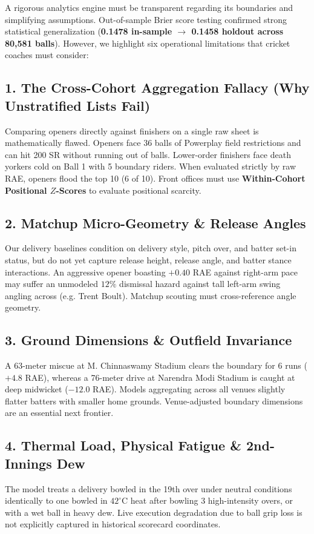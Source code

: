 \documentclass[10pt,a4paper]{article}
\begin{document}
A rigorous analytics engine must be transparent regarding its boundaries and simplifying assumptions. Out-of-sample Brier score testing confirmed strong statistical generalization (\textbf{0.1478 in-sample $\to$ 0.1458 holdout across 80,581 balls}). However, we highlight six operational limitations that cricket coaches must consider:

\subsection*{1. The Cross-Cohort Aggregation Fallacy (Why Unstratified Lists Fail)}
Comparing openers directly against finishers on a single raw sheet is mathematically flawed. Openers face 36 balls of Powerplay field restrictions and can hit 200 SR without running out of balls. Lower-order finishers face death yorkers cold on Ball 1 with 5 boundary riders. When evaluated strictly by raw RAE, openers flood the top 10 (6 of 10). Front offices must use \textbf{Within-Cohort Positional $Z$-Scores} to evaluate positional scarcity.

\subsection*{2. Matchup Micro-Geometry \& Release Angles}
Our delivery baselines condition on delivery style, pitch over, and batter set-in status, but do not yet capture release height, release angle, and batter stance interactions. An aggressive opener boasting $+0.40$ RAE against right-arm pace may suffer an unmodeled $12\%$ dismissal hazard against tall left-arm swing angling across (e.g. Trent Boult). Matchup scouting must cross-reference angle geometry.

\subsection*{3. Ground Dimensions \& Outfield Invariance}
A 63-meter miscue at M. Chinnaswamy Stadium clears the boundary for 6 runs ($+4.8$ RAE), whereas a 76-meter drive at Narendra Modi Stadium is caught at deep midwicket ($-12.0$ RAE). Models aggregating across all venues slightly flatter batters with smaller home grounds. Venue-adjusted boundary dimensions are an essential next frontier.

\subsection*{4. Thermal Load, Physical Fatigue \& 2nd-Innings Dew}
The model treats a delivery bowled in the 19th over under neutral conditions identically to one bowled in $42^\circ\text{C}$ heat after bowling 3 high-intensity overs, or with a wet ball in heavy dew. Live execution degradation due to ball grip loss is not explicitly captured in historical scorecard coordinates.
\end{document}
